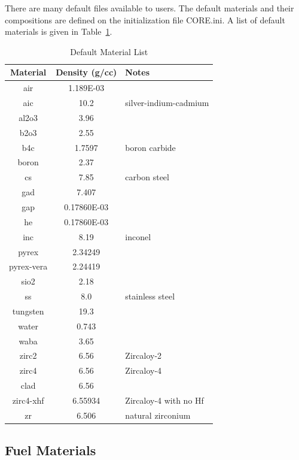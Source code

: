 There are many default files available to users. The default materials and their compositions
are defined on the initialization file CORE.ini.
A list of default materials is given in Table~\ref{table:mat}.
\begin{table}[hbt!]
\centering
\caption{Default Material List}
\label{table:mat}
\begin{tabular}{|c|c|l|}
\hline
  Material  & Density (g/cc)  & Notes \\
\hline
   air    &  1.189E-03  &        \\
   aic    &     10.2   &  silver-indium-cadmium      \\
   al2o3  &     3.96   &        \\
   b2o3   &     2.55   &        \\
   b4c    &   1.7597   &  boron carbide      \\
   boron  &     2.37   &        \\
   cs     &     7.85   &  carbon steel      \\
   gad    &     7.407  &        \\
   gap    & 0.17860E-03 &        \\
   he     & 0.17860E-03 &        \\
   inc    &    8.19    &  inconel      \\
   pyrex  &    2.34249 &        \\
   pyrex-vera& 2.24419 &        \\
   sio2     &   2.18   &        \\
   ss       &   8.0    &  stainless steel      \\
   tungsten &  19.3    &        \\
   water    &   0.743  &        \\
   waba     &   3.65   &        \\
   zirc2    &   6.56   &  Zircaloy-2      \\
   zirc4    &   6.56   &  Zircaloy-4      \\
   clad     &  6.56    &        \\
   zirc4-xhf&  6.55934 &  Zircaloy-4 with no Hf   \\
   zr       &  6.506   &  natural zirconium    \\
\hline
\end{tabular}
\end{table}

\subsection{Fuel Materials}

